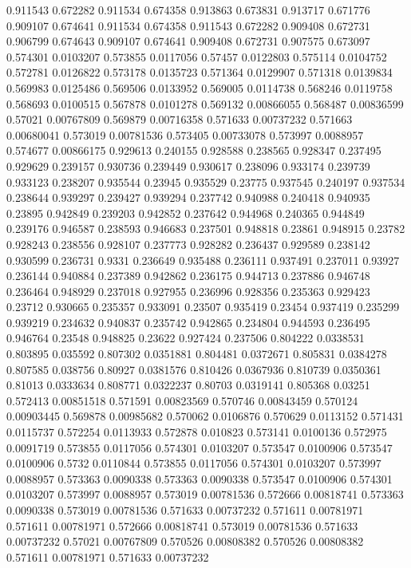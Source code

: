 0.911543 0.672282
0.911534 0.674358
0.913863 0.673831
0.913717 0.671776
0.909107 0.674641
0.911534 0.674358
0.911543 0.672282
0.909408 0.672731
0.906799 0.674643
0.909107 0.674641
0.909408 0.672731
0.907575 0.673097
0.574301 0.0103207
0.573855 0.0117056
0.57457 0.0122803
0.575114 0.0104752
0.572781 0.0126822
0.573178 0.0135723
0.571364 0.0129907
0.571318 0.0139834
0.569983 0.0125486
0.569506 0.0133952
0.569005 0.0114738
0.568246 0.0119758
0.568693 0.0100515
0.567878 0.0101278
0.569132 0.00866055
0.568487 0.00836599
0.57021 0.00767809
0.569879 0.00716358
0.571633 0.00737232
0.571663 0.00680041
0.573019 0.00781536
0.573405 0.00733078
0.573997 0.0088957
0.574677 0.00866175
0.929613 0.240155
0.928588 0.238565
0.928347 0.237495
0.929629 0.239157
0.930736 0.239449
0.930617 0.238096
0.933174 0.239739
0.933123 0.238207
0.935544 0.23945
0.935529 0.23775
0.937545 0.240197
0.937534 0.238644
0.939297 0.239427
0.939294 0.237742
0.940988 0.240418
0.940935 0.23895
0.942849 0.239203
0.942852 0.237642
0.944968 0.240365
0.944849 0.239176
0.946587 0.238593
0.946683 0.237501
0.948818 0.23861
0.948915 0.23782
0.928243 0.238556
0.928107 0.237773
0.928282 0.236437
0.929589 0.238142
0.930599 0.236731
0.9331 0.236649
0.935488 0.236111
0.937491 0.237011
0.93927 0.236144
0.940884 0.237389
0.942862 0.236175
0.944713 0.237886
0.946748 0.236464
0.948929 0.237018
0.927955 0.236996
0.928356 0.235363
0.929423 0.23712
0.930665 0.235357
0.933091 0.23507
0.935419 0.23454
0.937419 0.235299
0.939219 0.234632
0.940837 0.235742
0.942865 0.234804
0.944593 0.236495
0.946764 0.23548
0.948825 0.23622
0.927424 0.237506
0.804222 0.0338531
0.803895 0.035592
0.807302 0.0351881
0.804481 0.0372671
0.805831 0.0384278
0.807585 0.038756
0.80927 0.0381576
0.810426 0.0367936
0.810739 0.0350361
0.81013 0.0333634
0.808771 0.0322237
0.80703 0.0319141
0.805368 0.03251
0.572413 0.00851518
0.571591 0.00823569
0.570746 0.00843459
0.570124 0.00903445
0.569878 0.00985682
0.570062 0.0106876
0.570629 0.0113152
0.571431 0.0115737
0.572254 0.0113933
0.572878 0.010823
0.573141 0.0100136
0.572975 0.0091719
0.573855 0.0117056
0.574301 0.0103207
0.573547 0.0100906
0.573547 0.0100906
0.5732 0.0110844
0.573855 0.0117056
0.574301 0.0103207
0.573997 0.0088957
0.573363 0.0090338
0.573363 0.0090338
0.573547 0.0100906
0.574301 0.0103207
0.573997 0.0088957
0.573019 0.00781536
0.572666 0.00818741
0.573363 0.0090338
0.573019 0.00781536
0.571633 0.00737232
0.571611 0.00781971
0.571611 0.00781971
0.572666 0.00818741
0.573019 0.00781536
0.571633 0.00737232
0.57021 0.00767809
0.570526 0.00808382
0.570526 0.00808382
0.571611 0.00781971
0.571633 0.00737232

